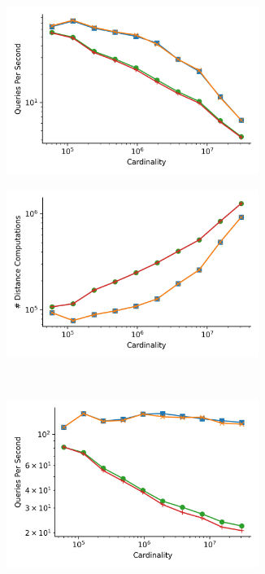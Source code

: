 \begin{figure}
    \begin{subfigure}[b]{0.47\textwidth}
        \includegraphics[width=0.9\textwidth]{images/distance_counts/fashion-mnist_KnnRepeatedRnn_10_throughput.png}
        \label{fig:results:fashion-mnist-counts-throughput}
    \end{subfigure}%
    \begin{subfigure}[b]{0.47\textwidth}
        \includegraphics[width=0.9\textwidth]{images/distance_counts/fashion-mnist_KnnRepeatedRnn_10_counts.png}
        \label{fig:results:glove-25-counts-counts}
    \end{subfigure}%
    \\
    \begin{subfigure}[b]{0.47\textwidth}
        \includegraphics[width=0.9\textwidth]{images/distance_counts/fashion-mnist_KnnBreadthFirst_10_throughput.png}

\end{subfigure}
\end{figure}
